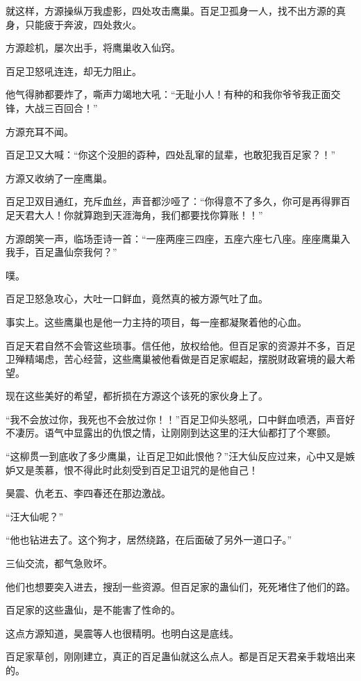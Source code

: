 \begin{this_body}
就这样，方源操纵万我虚影，四处攻击鹰巢。百足卫孤身一人，找不出方源的真身，只能疲于奔波，四处救火。

方源趁机，屡次出手，将鹰巢收入仙窍。

百足卫怒吼连连，却无力阻止。

他气得肺都要炸了，嘶声力竭地大吼：“无耻小人！有种的和我你爷爷我正面交锋，大战三百回合！”

方源充耳不闻。

百足卫又大喊：“你这个没胆的孬种，四处乱窜的鼠辈，也敢犯我百足家？！”

方源又收纳了一座鹰巢。

百足卫双目通红，充斥血丝，声音都沙哑了：“你得意不了多久，你可是再得罪百足天君大人！你就算跑到天涯海角，我们都要找你算账！！”

方源朗笑一声，临场歪诗一首：“一座两座三四座，五座六座七八座。座座鹰巢入我手，百足蛊仙奈我何？”

噗。

百足卫怒急攻心，大吐一口鲜血，竟然真的被方源气吐了血。

事实上。这些鹰巢也是他一力主持的项目，每一座都凝聚着他的心血。

百足天君自然不会管这些琐事。信任他，放权给他。但百足家的资源并不多，百足卫殚精竭虑，苦心经营，这些鹰巢被他看做是百足家崛起，摆脱财政窘境的最大希望。

现在这些美好的希望，都折损在方源这个该死的家伙身上了。

“我不会放过你，我死也不会放过你！！”百足卫仰头怒吼，口中鲜血喷洒，声音好不凄厉。语气中显露出的仇恨之情，让刚刚到达这里的汪大仙都打了个寒颤。

“这柳贯一到底收了多少鹰巢，让百足卫如此恨他？”汪大仙反应过来，心中又是嫉妒又是羡慕，恨不得此时此刻受到百足卫诅咒的是他自己！

昊震、仇老五、李四春还在那边激战。

“汪大仙呢？”

“他也钻进去了。这个狗才，居然绕路，在后面破了另外一道口子。”

三仙交流，都气急败坏。

他们也想要突入进去，搜刮一些资源。但百足家的蛊仙们，死死堵住了他们的路。

百足家的这些蛊仙，是不能害了性命的。

这点方源知道，昊震等人也很精明。也明白这是底线。

百足家草创，刚刚建立，真正的百足蛊仙就这么点人。都是百足天君亲手栽培出来的。


\end{this_body}
